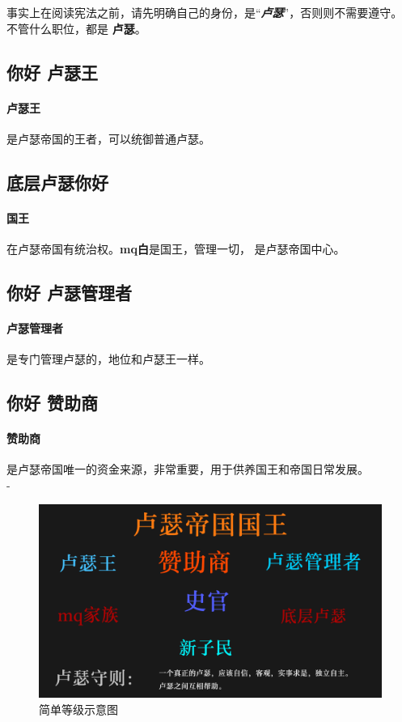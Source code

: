 事实上在阅读宪法之前，请先明确自己的身份，是“\textit{\textbf{卢瑟}}”，否则则不需要遵守。
不管什么职位，都是 \textbf{卢瑟}。
\subsection{你好 卢瑟王}
\paragraph{卢瑟王}是卢瑟帝国的王者，可以统御普通卢瑟。
\subsection{底层卢瑟你好}
\paragraph{国王}在卢瑟帝国有统治权。\textbf{mq白}是国王，管理一切， 是卢瑟帝国中心。
\subsection{你好 卢瑟管理者}
\paragraph{卢瑟管理者}是专门管理卢瑟的，地位和卢瑟王一样。

\subsection{你好 赞助商}
\paragraph{赞助商}是卢瑟帝国唯一的资金来源，非常重要，用于供养国王和帝国日常发展。\\
{\color{white}-}

\begin{figure}[H]
    \caption{简单等级示意图} 
    \centering 
    \includegraphics[width = .7\textwidth]{resource/luse.png}
\end{figure}

 
